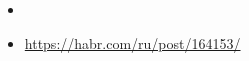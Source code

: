 \label{impl}\secdown

\begin{itemize}[nosep]
    \item \cite{little}
    \item \url{https://habr.com/ru/post/164153/}
\end{itemize}



\secup



